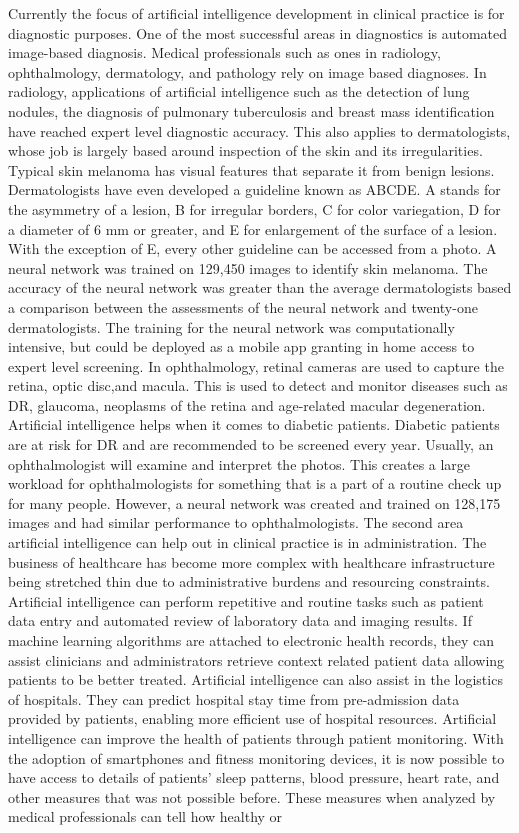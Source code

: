 \documentclass[]{article}
\begin{document}
		Currently the focus of artificial intelligence development  in clinical practice is for diagnostic purposes. One of the most successful areas in diagnostics is automated image-based diagnosis. Medical professionals such as ones in radiology, ophthalmology, dermatology, and pathology rely on image based diagnoses. In radiology, applications of artificial intelligence such as the detection of lung nodules, the diagnosis of pulmonary tuberculosis and breast mass identification have reached expert level diagnostic accuracy. This also applies to dermatologists, whose job is largely based around inspection of the skin and its irregularities. Typical skin melanoma has visual features that separate it from benign lesions. Dermatologists have even developed a guideline known as ABCDE. A stands for the asymmetry of a lesion, B for irregular borders, C for color variegation, D for a diameter of 6 mm or greater, and E for enlargement of the surface of a lesion. With the exception of E, every other guideline can be accessed from a photo. A neural network was trained on 129,450 images to identify skin melanoma. The accuracy of the neural network was greater than the average dermatologists based a comparison between the assessments of the neural network and twenty-one dermatologists. The training for the neural network was computationally intensive, but could be deployed as a mobile app granting in home access to expert level screening. In ophthalmology, retinal cameras are used to capture the retina, optic disc,and macula. This is used to detect and monitor diseases such as DR, glaucoma, neoplasms of the retina and age-related macular degeneration. Artificial intelligence helps when it comes to diabetic patients. Diabetic patients are at risk for DR and are recommended to be screened every year. Usually, an ophthalmologist will examine and interpret the photos. This creates a large workload for ophthalmologists for something that is a part of a routine check up for many people. However, a neural network was created and trained on 128,175 images and had similar performance to ophthalmologists.\cite{yu2018artificial} The second area artificial intelligence can help out in clinical practice is in administration. The business of healthcare has become more complex with healthcare infrastructure being stretched thin due to administrative burdens and resourcing constraints. Artificial intelligence can perform repetitive and routine tasks such as patient data entry and automated review of laboratory data and imaging results. If machine learning algorithms are attached to electronic health records, they can assist clinicians and administrators retrieve context related patient data allowing patients to be better treated. Artificial intelligence can also assist in the logistics of hospitals. They can predict hospital stay time from pre-admission data provided by patients, enabling more efficient use of hospital resources. Artificial intelligence can improve the health of patients through patient monitoring. With the adoption of smartphones and fitness monitoring devices, it is now possible to have access to details of patients’ sleep patterns, blood pressure, heart rate, and other measures that was not possible before. These measures when analyzed by medical professionals can tell how healthy or 
\end{document}

